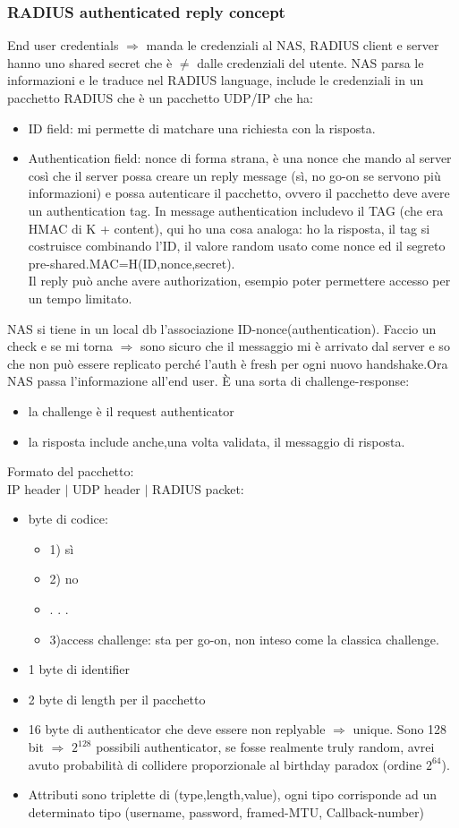 \documentclass[16px]{article}
\begin{document}
\subsubsection{RADIUS authenticated reply concept}
End user credentials $\Longrightarrow$ manda le credenziali al NAS, RADIUS client e server hanno uno shared secret che è $\neq$ dalle credenziali del utente. NAS parsa le informazioni e le traduce nel RADIUS language, include le credenziali in un pacchetto RADIUS che è un pacchetto UDP/IP che ha:
\begin{itemize}
\item ID field: mi permette di matchare una richiesta con la risposta.
\item Authentication field: nonce di forma strana, è una nonce che mando al server così che il server possa creare un reply message (sì, no go-on se servono più informazioni) e possa autenticare il pacchetto, ovvero il pacchetto deve avere un authentication tag. In message authentication includevo il TAG (che era HMAC di K + content), qui ho una cosa analoga: ho la risposta, il tag si costruisce combinando l'ID, il valore random usato come nonce ed il segreto pre-shared.MAC=H(ID,nonce,secret).\\ Il reply può anche avere authorization, esempio poter permettere accesso per un tempo limitato.
\end{itemize}
NAS si tiene in un local db l'associazione ID-nonce(authentication). Faccio un check e se mi torna $\Rightarrow$ sono sicuro che il messaggio mi è arrivato dal server e so che non può essere replicato perché l'auth è fresh per ogni nuovo handshake.Ora NAS passa l'informazione all'end user. È una sorta di challenge-response:
\begin{itemize}
\item la challenge è il request authenticator
\item la risposta include anche,una volta validata, il messaggio di risposta.
\end{itemize}
Formato del pacchetto:\\
IP header $|$ UDP header $|$ RADIUS packet: 
\begin{itemize} 
\item byte di codice:
\begin{itemize}
\item 1) sì
\item 2) no
\item . . .
\item 3)access challenge: sta per go-on, non inteso come la classica challenge.
\end{itemize}
\item 1 byte di identifier
\item 2 byte di length per il pacchetto
\item 16 byte di authenticator che deve essere non replyable $\Rightarrow$ unique. Sono 128 bit $\Rightarrow$ $2^{128}$ possibili authenticator, se fosse realmente truly random, avrei avuto probabilità di collidere proporzionale al birthday paradox (ordine $2^{64}$). 
\item Attributi sono triplette di (type,length,value), ogni tipo corrisponde ad un determinato tipo (username, password, framed-MTU, Callback-number)
\end{itemize}
\end{document}
